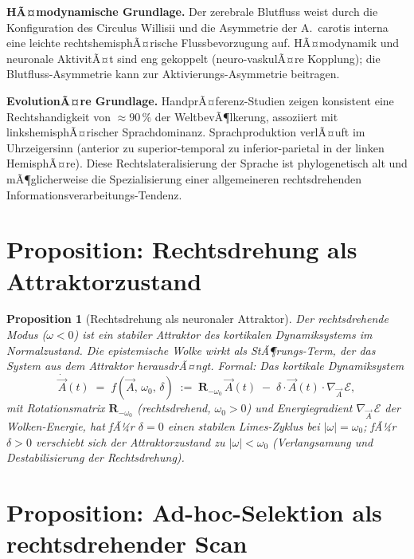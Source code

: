 ﻿\documentclass[12pt,a4paper]{report}
\theoremstyle{plain}
\newtheorem{proposition}[theorem]{Proposition}
\theoremstyle{definition}
\theoremstyle{remark}
\begin{document}
	\textbf{HÃ¤modynamische Grundlage.}
	Der zerebrale Blutfluss weist durch die Konfiguration des Circulus
	Willisii und die Asymmetrie der A.\ carotis interna eine leichte
	rechtshemisphÃ¤rische Flussbevorzugung auf. HÃ¤modynamik und
	neuronale AktivitÃ¤t sind eng gekoppelt (neuro-vaskulÃ¤re Kopplung);
	die Blutfluss-Asymmetrie kann zur Aktivierungs-Asymmetrie beitragen.
	
	\textbf{EvolutionÃ¤re Grundlage.}
	HandprÃ¤ferenz-Studien zeigen konsistent eine Rechtshandigkeit von
	$\approx 90\,\%$ der WeltbevÃ¶lkerung, assoziiert mit linkshemisphÃ¤rischer
	Sprachdominanz. Sprachproduktion verlÃ¤uft im Uhrzeigersinn (anterior
	zu superior-temporal zu inferior-parietal in der linken HemisphÃ¤re).
	Diese Rechtslateralisierung der Sprache ist phylogenetisch alt und
	mÃ¶glicherweise die Spezialisierung einer allgemeineren rechtsdrehenden
	Informationsverarbeitungs-Tendenz.
	
	\section{Proposition: Rechtsdrehung als Attraktorzustand}
	
	\begin{proposition}[Rechtsdrehung als neuronaler Attraktor]
		\label{prop:attraktor}
		Der rechtsdrehende Modus ($\omega < 0$) ist ein stabiler Attraktor
		des kortikalen Dynamiksystems im Normalzustand.
		Die epistemische Wolke wirkt als StÃ¶rungs-Term, der das System
		aus dem Attraktor herausdrÃ¤ngt.
		Formal: Das kortikale Dynamiksystem
		\[
		\dot{\vec{A}}(t) \;=\; f(\vec{A},\, \omega_0,\, \delta)
		\;:=\;
		\mathbf{R}_{-\omega_0}\,\vec{A}(t)
		\;-\; \delta \cdot \vec{A}(t) \cdot \nabla_{\vec{A}}\,\mathcal{E},
		\]
		mit Rotationsmatrix $\mathbf{R}_{-\omega_0}$ (rechtsdrehend,
		$\omega_0 > 0$) und Energiegradient $\nabla_{\vec{A}}\,\mathcal{E}$
		der Wolken-Energie, hat fÃ¼r $\delta = 0$ einen stabilen
		Limes-Zyklus bei $|\omega| = \omega_0$; fÃ¼r $\delta > 0$
		verschiebt sich der Attraktorzustand zu $|\omega| < \omega_0$
		(Verlangsamung und Destabilisierung der Rechtsdrehung).
	\end{proposition}
	
	\section{Proposition: Ad-hoc-Selektion als rechtsdrehender Scan}
	
\end{document}
